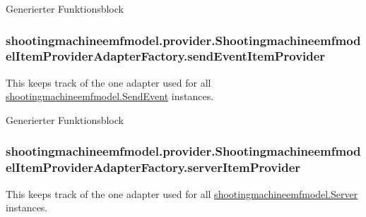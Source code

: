 Generierter Funktionsblock \hypertarget{classshootingmachineemfmodel_1_1provider_1_1_shootingmachineemfmodel_item_provider_adapter_factory_a1ed08de0a7947895cf2a1e5cac91b903}{
\subsubsection[{send\-Event\-Item\-Provider}]{ shootingmachineemfmodel.\-provider.\-Shootingmachineemfmodel\-Item\-Provider\-Adapter\-Factory.\-send\-Event\-Item\-Provider\hspace{0.3cm}{\ttfamily [protected]}}}\label{classshootingmachineemfmodel_1_1provider_1_1_shootingmachineemfmodel_item_provider_adapter_factory_a1ed08de0a7947895cf2a1e5cac91b903}
This keeps track of the one adapter used for all \hyperlink{interfaceshootingmachineemfmodel_1_1_send_event}{shootingmachineemfmodel.\-Send\-Event} instances.

Generierter Funktionsblock \hypertarget{classshootingmachineemfmodel_1_1provider_1_1_shootingmachineemfmodel_item_provider_adapter_factory_ac40520d1465e340650d3a7e6d918ef6f}{
\subsubsection[{server\-Item\-Provider}]{ shootingmachineemfmodel.\-provider.\-Shootingmachineemfmodel\-Item\-Provider\-Adapter\-Factory.\-server\-Item\-Provider\hspace{0.3cm}{\ttfamily [protected]}}}\label{classshootingmachineemfmodel_1_1provider_1_1_shootingmachineemfmodel_item_provider_adapter_factory_ac40520d1465e340650d3a7e6d918ef6f}
This keeps track of the one adapter used for all \hyperlink{interfaceshootingmachineemfmodel_1_1_server}{shootingmachineemfmodel.\-Server} instances.

